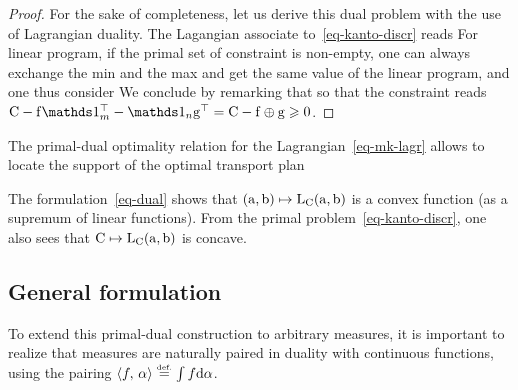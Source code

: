 \begin{proof}
%
For the sake of completeness, let us derive this dual problem with the use of Lagrangian duality. The Lagangian associate to~\eqref{eq-kanto-discr} reads
For linear program, if the primal set of constraint is non-empty, one can always exchange the min and the max and get the same value of the linear program, and one thus consider
We conclude by remarking that 
so that the constraint reads $\C - \fD\ones_m^\top - \ones_n \gD^\top = \C-\fD\oplus \gD \geq 0$.
\end{proof}

The primal-dual optimality relation for the Lagrangian~\eqref{eq-mk-lagr} allows to locate the support of the optimal transport plan

The formulation~\eqref{eq-dual} shows that $(\mathrm{a},\mathrm{b}) \mapsto \mathrm{L}_{\mathrm{C}}(\mathrm{a},\mathrm{b})$ is a convex function (as a supremum of linear functions). From the primal problem~\eqref{eq-kanto-discr}, one also sees that $\mathrm{C} \mapsto \mathrm{L}_{\mathrm{C}}(\mathrm{a},\mathrm{b})$ is concave. 


  
\subsection{General formulation}

To extend this primal-dual construction to arbitrary measures, it is important to realize that measures are naturally paired in duality with continuous functions, using the pairing $\langle f,\,\alpha\rangle \stackrel{\mbox{\upshape\tiny def.}}{=} \int f \mathrm{d} \alpha$.

